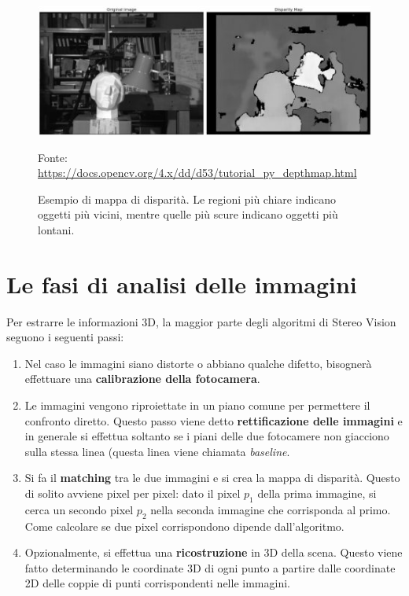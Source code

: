 \documentclass[12pt,a4paper,openright,twoside]{report}
\newcommand{\source}[1]{\caption*{\hfill \scriptsize Fonte: {#1}} }
\begin{document}
\begin{figure}[h]
    \centering
    \includegraphics[width=\textwidth]{disparity_map.jpg}
    \source{\url{https://docs.opencv.org/4.x/dd/d53/tutorial_py_depthmap.html}}
    \caption[Esempio di mappa di disparità.]{Esempio di mappa di disparità. Le regioni più chiare indicano oggetti più vicini, mentre quelle più scure indicano oggetti più lontani.}
    \label{img:disparity_map}
\end{figure}

\section{Le fasi di analisi delle immagini}

Per estrarre le informazioni 3D, la maggior parte degli algoritmi di Stereo Vision seguono i seguenti passi:

\begin{enumerate}
    \item Nel caso le immagini siano distorte o abbiano qualche difetto, bisognerà effettuare una \textbf{calibrazione della fotocamera}.
    \item Le immagini vengono riproiettate in un piano comune per permettere il confronto diretto. Questo passo viene detto \textbf{rettificazione delle immagini} e in generale si effettua soltanto se i piani delle due fotocamere non giacciono sulla stessa linea (questa linea viene chiamata \textit{baseline}.
    \item Si fa il \textbf{matching} tra le due immagini e si crea la mappa di disparità. Questo di solito avviene pixel per pixel: dato il pixel $p_{1}$ della prima immagine, si cerca un secondo pixel $p_{2}$ nella seconda immagine che corrisponda al primo. Come calcolare se due pixel corrispondono dipende dall'algoritmo.
    \item Opzionalmente, si effettua una \textbf{ricostruzione} in 3D della scena. Questo viene fatto determinando le coordinate 3D di ogni punto a partire dalle coordinate 2D delle coppie di punti corrispondenti nelle immagini.
\end{enumerate}
\end{document}
